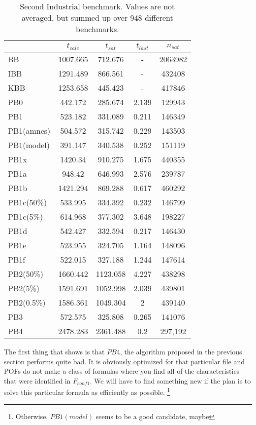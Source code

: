 \begin{wraptable}{R}{8cm}
\begin{tabular}{l| c c c c}
& $t_{calc}$ & $t_{sat}$ & $t_{last}$ & $n_{sat}$ \\
 \hline
BB & 1007.665 & 712.676 & - & 2063982 \\
IBB & 1291.489 & 866.561 & - & 432408 \\
KBB & 1253.658 & 445.423 & - & 417846 \\
PB0 & 442.172 & 285.674 & 2.139 & 129943 \\
PB1 & 523.182 & 331.089 & 0.211 & 146349 \\
PB1(amnes) & 504.572 & 315.742 & 0.229 & 143503 \\
PB1(model) & 391.147 & 340.538 & 0.252 & 151119 \\
PB1x & 1420.34 & 910.275 & 1.675 & 440355 \\
PB1a & 948.42 & 646.993 & 2.576 & 239787 \\
PB1b & 1421.294 & 869.288 & 0.617 & 460292 \\
PB1c(50\%) & 533.995 & 334.392 & 0.232 & 146799 \\
PB1c(5\%) & 614.968 & 377.302 & 3.648 & 198227 \\
PB1d & 542.427 & 332.594 & 0.217 & 146430 \\
PB1e & 523.955 & 324.705 & 1.164 & 148096 \\
PB1f & 522.015 & 327.188 & 1.244 & 147614 \\
PB2(50\%) & 1660.442 & 1123.058 & 4.227 & 438298 \\
PB2(5\%) & 1591.691 & 1052.998 & 2.039 & 439801 \\
PB2(0.5\%) & 1586.361 & 1049.304 & 2 & 439140 \\
PB3 & 572.575 & 325.808 & 0.265 & 141076 \\
PB4 & 2478.283 & 2361.488 & 0.2 &297,192 \\
\end{tabular}
\caption{Second Industrial benchmark. Values are not averaged, but summed up over 948 different benchmarks.}
\label{tab:vonThore2pof} %
\end{wraptable}

The first thing that shows is that $PB4$, the algorithm proposed in the previous section performs quite bad. It is obviously optimized for that particular file and POFs do not make a class of formulas where you find all of the characteristics that were identified in $F_{conf1}$. We will have to find something new if the plan is to solve this particular formula as efficiently as possible. \footnote{Otherwise, $PB1(model)$ seems to be a good candidate, maybe}

